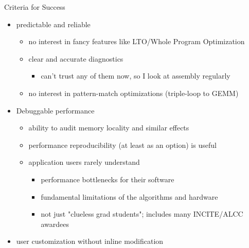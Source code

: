 \documentclass{beamer}
\begin{document}
\begin{frame}{Criteria for Success}
  \begin{itemize}
  \item predictable and reliable
    \begin{itemize}
    \item no interest in fancy features like LTO/Whole Program Optimization
    \item clear and accurate diagnostics
      \begin{itemize}
      \item can't trust any of them now, so I look at assembly regularly
      \end{itemize}
    \item no interest in pattern-match optimizations (triple-loop to GEMM)
    \end{itemize}
  \item Debuggable performance
    \begin{itemize}
    \item ability to audit memory locality and similar effects
    \item performance reproducibility (at least as an option) is useful
    \item application users rarely understand
      \begin{itemize}
      \item performance bottlenecks for their software
      \item fundamental limitations of the algorithms and hardware
      \item not just "clueless grad students"; includes many INCITE/ALCC awardees
      \end{itemize}
    \end{itemize}
  \item user customization without inline modification
  \end{itemize}
\end{frame}
\end{document}
